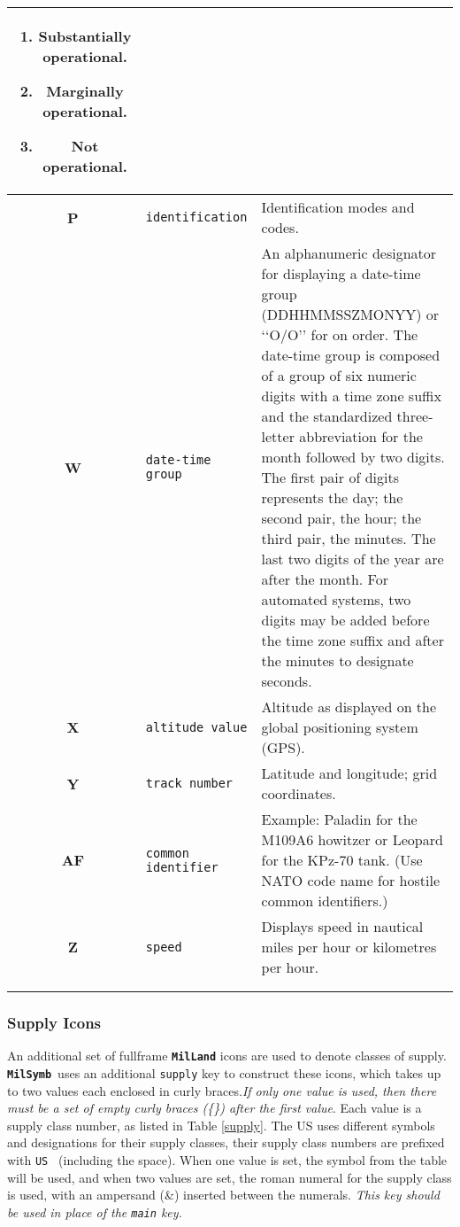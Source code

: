 \documentclass[a4paper, titlepage]{article}
\newcommand\MilSymb{\textbf{\texttt{MilSymb}}}
\begin{document}
\begin{center}
\begin{tabularx}{\textwidth}{|c|l|X|}
\begin{enumerate}[label=\arabic*., align=left]
\item Substantially operational.
\item Marginally operational.
\item Not operational.
\end{enumerate} \\ \hline
\textbf{P} & \texttt{identification} & Identification modes and codes.\\ \hline
\textbf{W} & \texttt{date-time group} & An alphanumeric designator for displaying a date-time group (DDHHMMSSZMONYY) or \lq\lq{}O/O\rq\rq{} for on order. The date-time group is composed of a group of six numeric digits with a time zone suffix and the standardized three-letter abbreviation for the month followed by two digits. The first pair of digits represents the day; the second pair, the hour; the third pair, the minutes. The last two digits of the year are after the month. For automated systems, two digits may be added before the time zone suffix and after the minutes to designate seconds.\\ \hline
\textbf{X} & \texttt{altitude value} & Altitude as displayed on the global positioning system (GPS). \\ \hline
\textbf{Y} & \texttt{track number} & Latitude and longitude; grid coordinates. \\ \hline
\textbf{AF} & \texttt{common identifier} & Example: Paladin for the M109A6 howitzer or Leopard for the KPz-70 tank. (Use NATO code name for hostile common identifiers.) \\ \hline
\textbf{Z} & \texttt{speed} & Displays speed in nautical miles per hour or kilometres per hour. \\ \hline
\multicolumn{3}{c}{}\\
\caption{Description of \textbf{\texttt{MilLand}} text field amplifiers.}
\label{landtexttable}
\end{tabularx}
\end{center}

\subsubsection{Supply Icons}

An additional set of fullframe \textbf{\texttt{MilLand}} icons are used to denote classes of supply. \MilSymb\ uses an additional \texttt{supply} key to construct these icons, which takes up to two values each enclosed in curly braces.\textit{If only one value is used, then there must be a set of empty curly braces (\{\}) after the first value}. Each value is a supply class number, as listed in Table \ref{supply}. The US uses different symbols and designations for their supply classes, their supply class numbers are prefixed with \texttt{US } (including the space). When one value is set, the symbol from the table will be used, and when two values are set, the roman numeral for the supply class is used, with an ampersand (\&) inserted between the numerals. \textit{This key should be used in place of the \texttt{main} key.}
\end{document}
